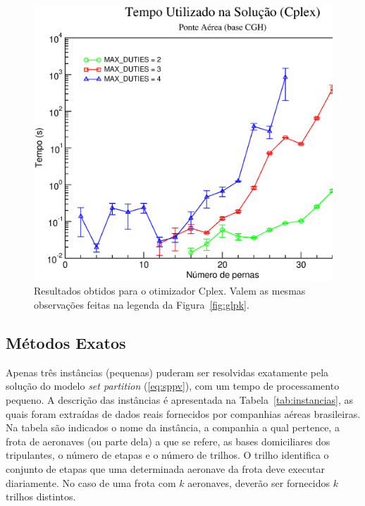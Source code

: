 \documentclass[12pt,a4paper]{article}
\begin{document}
\begin{figure}[htb]
	\begin{center}
		\includegraphics[scale=0.45,angle=0]{fig/cplex_solution_time.eps}
		\caption{Resultados obtidos para o otimizador Cplex. Valem as mesmas observações feitas na 
		legenda da Figura~\ref{fig:glpk}.}
		\label{fig:cplex}
	\end{center}
\end{figure}


\subsection{Métodos Exatos}
\label{sec:resultados_exatos}

Apenas três instâncias (pequenas) puderam ser resolvidas exatamente pela solução do modelo {\it set
partition} (\ref{eq:sppv}), com um tempo de processamento pequeno. A descrição das instâncias é
apresentada na Tabela~\ref{tab:instancias}, as quais foram extraídas de dados reais fornecidos por
companhias aéreas brasileiras. Na tabela são indicados o nome da instância, a companhia a qual
pertence, a frota de aeronaves (ou parte dela) a que se refere, as bases domiciliares dos
tripulantes, o número de etapas e o número de trilhos. O trilho identifica o conjunto de etapas que
uma determinada aeronave da frota deve executar diariamente. No caso de uma frota com $k$ aeronaves,
deverão ser fornecidos $k$ trilhos distintos.
\end{document}
